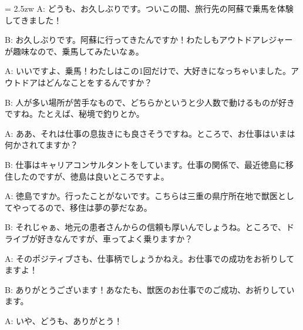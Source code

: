 \documentclass[11pt]{amsart}
\title{}
\author{}
\newenvironment{hangall}[1]{\hangindent = 2.5zw\everypar{\hangindent = 2.5zw}}{}
\begin{document}
\maketitle
\begin{hangall}{}%
A: どうも、お久しぶりです。ついこの間、旅行先の阿蘇で乗馬を体験してきました！



B: お久しぶりです。阿蘇に行ってきたんですか！わたしもアウトドアレジャーが趣味なので、乗馬してみたいなぁ。



A: いいですよ、乗馬！わたしはこの1回だけで、大好きになっちゃいました。アウトドアはどんなことをするんですか？



B: 人が多い場所が苦手なもので、どちらかというと少人数で動けるものが好きですね。たとえば、秘境で釣りとか。



A: ああ、それは仕事の息抜きにも良さそうですね。ところで、お仕事はいまは何かされてますか？



B: 仕事はキャリアコンサルタントをしています。仕事の関係で、最近徳島に移住したのですが、徳島は良いところですよ。



A: 徳島ですか。行ったことがないです。こちらは三重の県庁所在地で獣医としてやってるので、移住は夢の夢だなあ。



B: それじゃぁ、地元の患者さんからの信頼も厚いんでしょうね。ところで、ドライブが好きなんですが、車ってよく乗りますか？



A: そのポジティブさも、仕事柄でしょうかねえ。お仕事での成功をお祈りしてますよ！



B: ありがとうございます！あなたも、獣医のお仕事でのご成功、お祈りしています。



A: いや、どうも、ありがとう！\end{hangall}
\end{document}
